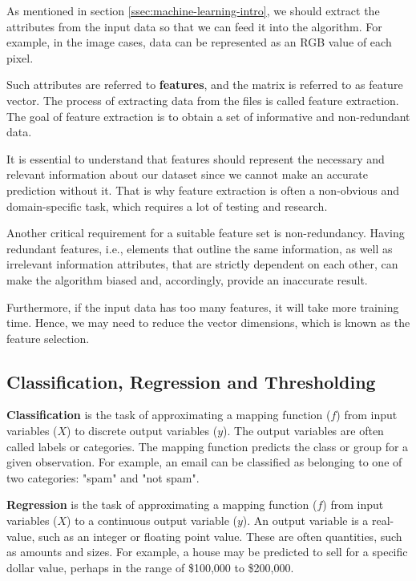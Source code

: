 As mentioned in section \ref{ssec:machine-learning-intro}, we should extract the attributes from the input data so that we can feed it into the algorithm. For example, in the image cases, data can be represented as an RGB value of each pixel.

Such attributes are referred to \textbf{features}, and the matrix is referred to as feature vector. The process of extracting data from the files is called feature extraction. The goal of feature extraction is to obtain a set of informative and non-redundant data. 

It is essential to understand that features should represent the necessary and relevant information about our dataset since we cannot make an accurate prediction without it. That is why feature extraction is often a non-obvious and domain-specific task, which requires a lot of testing and research.

Another critical requirement for a suitable feature set is non-redundancy. Having redundant features, i.e., elements that outline the same information, as well as irrelevant information attributes, that are strictly dependent on each other, can make the algorithm biased and, accordingly, provide an inaccurate result.

Furthermore, if the input data has too many features, it will take more training time. Hence, we may need to reduce the vector dimensions, which is known as the feature selection.

\subsection{Classification, Regression and Thresholding}

\textbf{Classification} is the task of approximating a mapping function ($f$) from input variables ($X$) to discrete output variables ($y$). The output variables are often called labels or categories. The mapping function predicts the class or group for a given observation. For example, an email can be classified as belonging to one of two categories: "spam" and "not spam".

\textbf{Regression} is the task of approximating a mapping function ($f$) from input variables ($X$) to a continuous output variable ($y$). An output variable is a real-value, such as an integer or floating point value. These are often quantities, such as amounts and sizes. For example, a house may be predicted to sell for a specific dollar value, perhaps in the range of \$100,000 to \$200,000.

